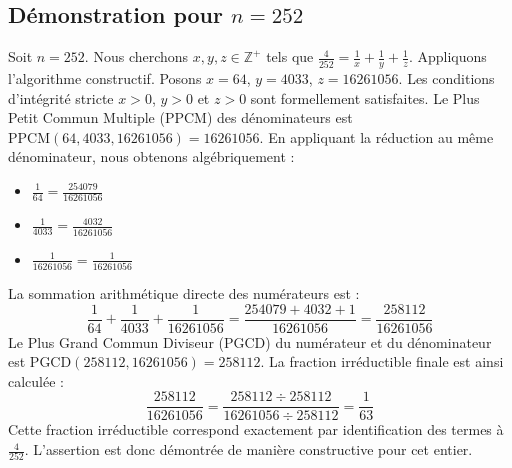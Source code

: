 \documentclass[11pt,a4paper]{article}
\begin{document}
\subsection{Démonstration pour $n = 252$}
Soit $n = 252$. Nous cherchons $x, y, z \in \mathbb{Z}^{+}$ tels que $\frac{4}{252} = \frac{1}{x} + \frac{1}{y} + \frac{1}{z}$.
Appliquons l'algorithme constructif. Posons $x = 64$, $y = 4033$, $z = 16261056$.
Les conditions d'intégrité stricte $x > 0$, $y > 0$ et $z > 0$ sont formellement satisfaites.
Le Plus Petit Commun Multiple (PPCM) des dénominateurs est $\text{PPCM}(64, 4033, 16261056) = 16261056$.
En appliquant la réduction au même dénominateur, nous obtenons algébriquement :
\begin{itemize}
    \item $\frac{1}{64} = \frac{254079}{16261056}$
    \item $\frac{1}{4033} = \frac{4032}{16261056}$
    \item $\frac{1}{16261056} = \frac{1}{16261056}$
\end{itemize}
La sommation arithmétique directe des numérateurs est :
$$ \frac{1}{64} + \frac{1}{4033} + \frac{1}{16261056} = \frac{254079 + 4032 + 1}{16261056} = \frac{258112}{16261056} $$
Le Plus Grand Commun Diviseur (PGCD) du numérateur et du dénominateur est $\text{PGCD}(258112, 16261056) = 258112$.
La fraction irréductible finale est ainsi calculée :
$$ \frac{258112}{16261056} = \frac{258112 \div 258112}{16261056 \div 258112} = \frac{1}{63} $$
Cette fraction irréductible correspond exactement par identification des termes à $\frac{4}{252}$. L'assertion est donc démontrée de manière constructive pour cet entier.
\end{document}
